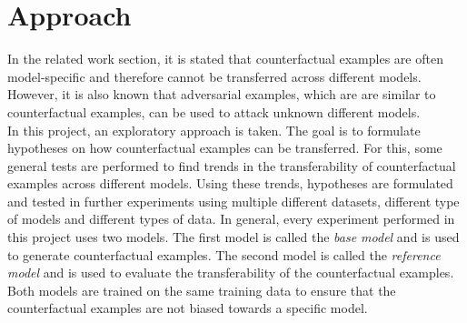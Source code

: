 \documentclass{article}
\begin{document}
\section{Approach}
In the related work section, it is stated that counterfactual examples are often model-specific and therefore cannot be transferred across different models. However, it is also known that adversarial examples, which are are similar to counterfactual examples, can be used to attack unknown different models.\\
In this project, an exploratory approach is taken. The goal is to formulate hypotheses on how counterfactual examples can be transferred. For this, some general tests are performed to find trends in the transferability of counterfactual examples across different models. Using these trends, hypotheses are formulated and tested in further experiments using multiple different datasets, different type of models and different types of data.
In general, every experiment performed in this project uses two models. The first model is called the \textit{base model} and is used to generate counterfactual examples. The second model is called the \textit{reference model} and is used to evaluate the transferability of the counterfactual examples. Both models are trained on the same training data to ensure that the counterfactual examples are not biased towards a specific model.\\
\end{document}

